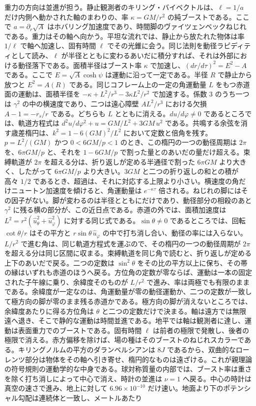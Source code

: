 \documentclass[a4paper]{article}
\begin{document}
重力の方向は並進が担う。静止観測者のキリング・バイベクトルは、\(\ell=1/a\) だけ内側へ動かされた軸のまわりの、率 \(\kappa=GM/r^{2}\) の純ブーストである。ここで \(a=\partial_{r}\sqrt{A}\) はホバリング加速度であり、時間脚のヴァイツェンベックねじれである。重力はその軸へ向かう。平坦な流れでは、静止から放たれた物体は率 \(1/\ell\) で軸へ加速し、固有時間 \(\ell\) でその光錐に会う。同じ法則を動径ラピディティとして読み、\(\ell\) が半径とともに変わるあいだに積分すれば、それは外部における動径落下である。面積半径はブースト率 \(\kappa\) で加速し、\((dr/d\tau)^{2}=E^{2}-A\) である。ここで \(E=\sqrt{A}\cosh\psi\) は運動に沿って一定である。半径 \(R\) で静止から放つと \(E^{2}=A(R)\) である。同じコフレーム上の一定の角運動量 \(L\) をもつ赤道面の運動は、面積半径を \(-\kappa+L^{2}/r^{3}-3\kappa L^{2}/r^{2}\) で加速する。係数 \(3\) のうち一つは \(\gamma^{2}\) の中の横速度であり、二つは遠心障壁 \(A L^{2}/r^{3}\) における欠損 \(A-1=-r_{s}/r\) である。どちらも \(L\) とともに消える。\(du/d\varphi\neq 0\) であるところでは、軌道方程式は \(d^{2}u/d\varphi^{2}+u=GM/L^{2}+3GM\,u^{2}\) である。共鳴する余弦を消す歳差楕円は、\(k^{2}=1-6(GM)^{2}/L^{2}\) において定数と倍角を残す。\(p=L^{2}/(GM)\) かつ \(0<6GM/p<1\) のとき、この楕円の一つの動径周期は \(2\pi\) を、\(6\pi GM/p\) と、それを \(1-6GM/p\) で割った量とのあいだの量だけ超える。束縛軌道が \(2\pi\) を超える分は、折り返しが定める半通径で割った \(6\pi GM\) より大きく、したがって \(6\pi GM/p\) より大きい。\(3GM\) と二つの折り返しの和との積が高々 \(1/2\) であるとき、超過は、それに対応する上限より小さい。横速度の角だけニュートン加速度を傾けると、角運動量は \(e^{-\kappa\tau}\) 倍される。ねじれの脚にはその因子がない。脚が変わるのは半径とともにだけであり、動径部分の相殺のあと \(\gamma^{2}\) に残る横の部分が、この近日点である。赤道の外では、面積加速度は \(L^{2}=r^{2}(\hat{u}_{\theta}^{2}+\hat{u}_{\varphi}^{2})\) に対する同じ式である。\(\sin\theta\neq 0\) であるところでは、回転 \(\cot\theta/r\) はその平方と \(r\sin\theta\,\hat{u}_{\varphi}\) の中で打ち消し合い、動径の率には入らない。\(L/r^{2}\) で進む角は、同じ軌道方程式を運ぶので、その楕円の一つの動径周期が \(2\pi\) を超える分は同じ区間に収まる。束縛軌道を同じ角で読むと、折り返しが定める上下のあいだで戻る。二つの定数は \(\sin^{2}\theta\) をその比の平方以上に保ち、その帯の縁はいずれも赤道のほうへ戻る。方位角の定数が零ならば、運動は一本の固定された子午線に乗り、余緯度そのものが \(L/r^{2}\) で進み、率は両極でも有限のままである。余緯度が一定なのは、角運動量が零の動径運動か、二つの定数が一致して極方向の脚が零のまま残る赤道かである。極方向の脚が消えないところでは、余緯度あたりに得る方位角は \(\theta\) と二つの定数だけで決まる。軸は遠方では無限遠へ退き、そこで静的な運動は時間並進である。地平では軸は観測者に達し、運動は表面重力でのブーストである。固有時間 \(\ell\) は前者の極限で発散し、後者の極限で消える。赤方偏移を除けば、場の種はそのブーストのねじれスカラーである。キリングノルムの平方のダランベルシアンは \(8J\) であるから、双曲的なローレンツ部分は物体をその軸へ引き寄せ、楕円的なものは遠ざける。これが親理論の符号規則の運動学的な中身である。球対称質量の内部では、ブースト率は重さを除く打ち消しによって中心で消え、時計の並進は \(\nu=1\) へ戻る。中心の時計は真空の速さで進み、地上に対して \(6.96\times 10^{-10}\) だけ速い。地面より下のポテンシャル勾配は連続体と一致し、メートルあたり 
\end{document}
